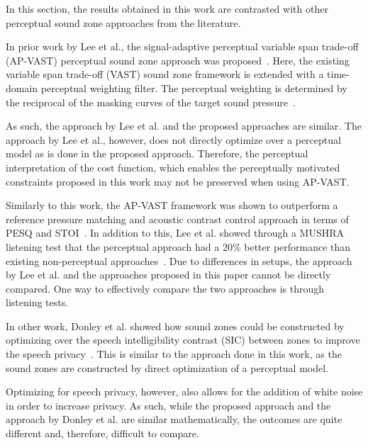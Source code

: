 In this section, the results obtained in this work are contrasted with other perceptual sound zone approaches from the literature.

In prior work by Lee et al., the signal-adaptive perceptual variable span trade-off (AP-VAST)
perceptual sound zone approach was proposed~\cite{lee2019towards, lee2020signal}.
Here, the existing variable span trade-off (VAST) sound zone framework is extended with a 
time-domain perceptual weighting filter.
The perceptual weighting is determined by the reciprocal of the masking curves of the 
target sound pressure~\cite{lee2020signal}.

As such, the approach by Lee et al. and the proposed approaches are similar.
The approach by Lee et al., however, does not directly optimize over a perceptual model as is done in the proposed approach.
Therefore, the perceptual interpretation of the cost function, which enables the perceptually motivated constraints
proposed in this work may not be preserved when using AP-VAST. 

Similarly to this work, the AP-VAST framework was shown to outperform a reference pressure matching
and acoustic contrast control approach in terms of PESQ and STOI~\cite{lee2019towards}.
In addition to this, Lee et al. showed through a MUSHRA listening test that the perceptual approach had a 20\%
better performance than existing non-perceptual approaches~\cite{lee2020signal}.
Due to differences in setups, the approach by Lee et al. and the approaches proposed in this paper cannot be 
directly compared.
One way to effectively compare the two approaches is through listening tests.

In other work, Donley et al. showed how sound zones could be constructed by optimizing over the speech
intelligibility contrast (SIC) between zones to improve the speech 
privacy~\cite{donley2015multizone, donley2016improving, donley2018multizone}.
This is similar to the approach done in this work, as the sound zones are constructed by direct optimization
of a perceptual model.

Optimizing for speech privacy, however, also allows for the addition of white noise in order to increase privacy.
As such, while the proposed approach and the approach by Donley et al. are similar mathematically, the outcomes are quite different and, therefore, difficult to compare.
